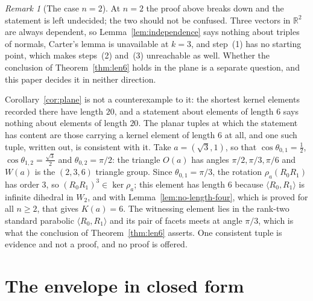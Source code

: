 \documentclass[11pt,a4paper]{article}
\newcommand{\R}{\mathbb{R}}
\theoremstyle{definition}
\theoremstyle{remark}
\newtheorem{remark}[theorem]{Remark}
\theoremstyle{plain}
\begin{document}
\begin{remark}[The case $n=2$]\label{rem:len6-n2}
At $n=2$ the proof above breaks down and the statement is left undecided; the two should not be
confused. Three vectors in $\R^2$ are always dependent, so Lemma~\ref{lem:independence} says
nothing about triples of normals, Carter's lemma is unavailable at $k=3$, and step~(1) has no
starting point, which makes steps~(2) and~(3) unreachable as well. Whether the conclusion of
Theorem~\ref{thm:len6} holds in the plane is a separate question, and this paper decides it in
neither direction.

Corollary~\ref{cor:plane} is not a counterexample to it: the shortest kernel elements recorded
there have length $20$, and a statement about elements of length $6$ says nothing about
elements of length $20$. The planar tuples at which the statement has content are those
carrying a kernel element of length $6$ at all, and one such tuple, written out, is consistent
with it. Take $a=(\sqrt3,1)$, so that $\cos\theta_{0,1}=\tfrac12$,
$\cos\theta_{1,2}=\tfrac{\sqrt3}2$ and $\theta_{0,2}=\pi/2$: the triangle $O(a)$ has angles
$\pi/2,\pi/3,\pi/6$ and $W(a)$ is the $(2,3,6)$ triangle group. Since $\theta_{0,1}=\pi/3$, the
rotation $\rho_a(R_0R_1)$ has order $3$, so $(R_0R_1)^3\in\ker\rho_a$; this element has length
$6$ because $\langle R_0,R_1\rangle$ is infinite dihedral in $W_2$, and with
Lemma~\ref{lem:no-length-four}, which is proved for all $n\ge2$, that gives $K(a)=6$. The
witnessing element lies in the rank-two standard parabolic $\langle R_0,R_1\rangle$ and its
pair of facets meets at angle $\pi/3$, which is what the conclusion of
Theorem~\ref{thm:len6} asserts. One consistent tuple is evidence and not a proof, and no proof
is offered.
\end{remark}

\section{The envelope in closed form}\label{sec:envelope}
\end{document}
